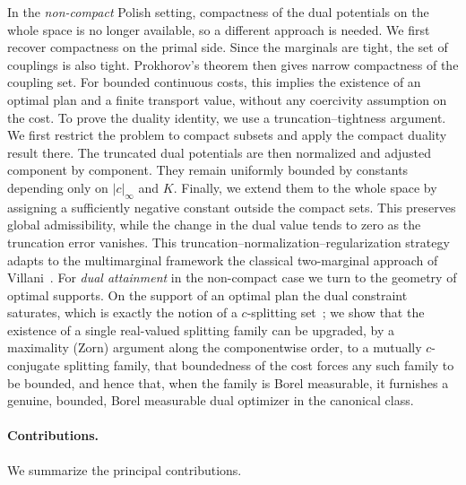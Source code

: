\documentclass[twoside,11pt,a4paper]{article}
\begin{document}
In the \emph{non-compact} Polish setting, compactness of the dual potentials on the whole space is no longer available, so a different approach is needed. We first recover compactness on the primal side. Since the marginals are tight, the set of couplings is also tight. Prokhorov's theorem then gives narrow compactness of the coupling set. For bounded continuous costs, this implies the existence of an optimal plan and a finite transport value, without any coercivity assumption on the cost. To prove the duality identity, we use a truncation--tightness argument. We first restrict the problem to compact subsets and apply the compact duality result there. The truncated dual potentials are then normalized and adjusted component by component. They remain uniformly bounded by constants depending only on $|c|_\infty$ and $K$. Finally, we extend them to the whole space by assigning a sufficiently negative constant outside the compact sets. This preserves global admissibility, while the change in the dual value tends to zero as the truncation error vanishes. This truncation--normalization--regularization
strategy adapts to the multimarginal framework the classical two-marginal approach
of Villani~\cite{villani2003}. For \emph{dual attainment} in the non-compact case
we turn to the geometry of optimal supports. On the support of an optimal plan the
dual constraint saturates, which is exactly the notion of a $c$-splitting
set~\cite{griessler2016}; we show that the existence of a single real-valued
splitting family can be upgraded, by a maximality (Zorn) argument along the
componentwise order, to a mutually $c$-conjugate splitting family, that boundedness
of the cost forces any such family to be bounded, and hence that, when the family
is Borel measurable, it furnishes a genuine, bounded, Borel measurable dual
optimizer in the canonical class.

\paragraph{Contributions.}
We summarize the principal contributions.
\end{document}
